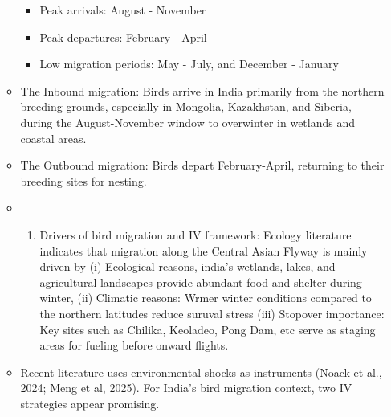 \documentclass[
  letterpaper,
]{article}
\providecommand{\tightlist}{%
  \setlength{\itemsep}{0pt}\setlength{\parskip}{0pt}}\usepackage{longtable,booktabs,array}
\begin{document}
\begin{tcolorbox}
\begin{enumerate}
\begin{itemize}
    \begin{itemize}
    \tightlist
    \item
      Peak arrivals: August - November
    \item
      Peak departures: February - April
    \item
      Low migration periods: May - July, and December - January
    \end{itemize}
  \item
    The Inbound migration: Birds arrive in India primarily from the
    northern breeding grounds, especially in Mongolia, Kazakhstan, and
    Siberia, during the August-November window to overwinter in wetlands
    and coastal areas.
  \item
    The Outbound migration: Birds depart February-April, returning to
    their breeding sites for nesting.
  \item
    \begin{enumerate}
    \def\labelenumii{(\roman{enumii})}
    \setcounter{enumii}{1}
    \tightlist
    \item
      Drivers of bird migration and IV framework: Ecology literature
      indicates that migration along the Central Asian Flyway is mainly
      driven by (i) Ecological reasons, india's wetlands, lakes, and
      agricultural landscapes provide abundant food and shelter during
      winter, (ii) Climatic reasons: Wrmer winter conditions compared to
      the northern latitudes reduce suruval stress (iii) Stopover
      importance: Key sites such as Chilika, Keoladeo, Pong Dam, etc
      serve as staging areas for fueling before onward flights.
    \end{enumerate}
  \item
    Recent literature uses environmental shocks as instruments (Noack et
    al., 2024; Meng et al, 2025). For India's bird migration context,
    two IV strategies appear promising.


\end{itemize}
\end{enumerate}
\end{tcolorbox}
\end{document}
